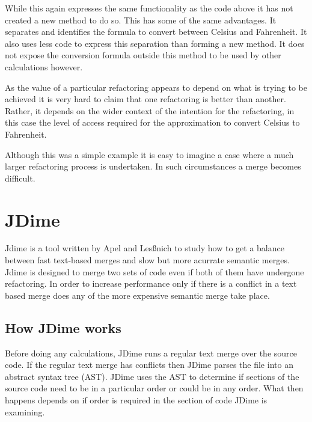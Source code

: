 While this again expresses the same functionality as the code above it has not created a new method to do so. This has some of the same advantages. It separates and identifies the formula to convert between Celsius and Fahrenheit. It also uses less code to express this separation than forming a new method. It does not expose the conversion formula outside this method to be used by other calculations however.

As the value of a particular refactoring appears to depend on what is trying to be achieved it is very hard to claim that one refactoring is better than another. Rather, it depends on the wider context of the intention for the refactoring, in this case the level of access required for the approximation to convert Celsius to Fahrenheit.

Although this was a simple example it is easy to imagine a case where a much larger refactoring process is undertaken. In such circumstances a merge becomes difficult. 

\section{JDime}

Jdime is a tool written by  Apel and Les{\ss}nich \cite{Apel2012} \cite{Apel2011} \cite{LeBenich2012} to study how to get a balance between fast text-based merges and slow but more acurrate semantic merges.  Jdime is designed to merge two sets of code even if both of them have undergone refactoring. In order to increase performance only if there is a conflict in a text based merge does any of the more expensive semantic merge take place. 

\subsection{How JDime works}

Before doing any calculations, JDime runs a regular text merge over the source code.  
If the regular text merge has conflicts then JDime parses the file into an abstract syntax tree (AST).  JDime uses the AST to determine if sections of the source code need to be in a particular order or could be in any order.
What then happens depends on if order is required in the section of code JDime is examining.

